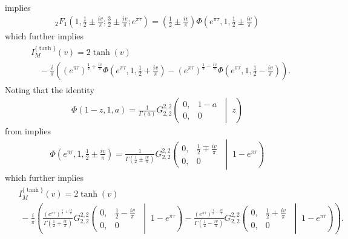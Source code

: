implies
\begin{align}
	{}_{2}F_{1}\left(1, \frac{1}{2} \pm \frac{iv}{\pi}; \frac{3}{2} \pm \frac{iv}{\pi}; e^{\pi \tau}\right)
	 = \left(\frac{1}{2} \pm \frac{iv}{\pi}\right)\Phi\left(e^{\pi\tau}, 1, \frac{1}{2} \pm \frac{iv}{\pi}\right)
\end{align}
which further implies
\begin{align}
\begin{split}
	&I_M^{\{\tanh\}}(v) = 2 \tanh(v) \\
	&\quad - \frac{i}{\pi}\left(
	    \left(e^{\pi\tau}\right)^{\frac{1}{2}+\frac{iv}{\pi}} \Phi \left(e^{\pi\tau}, 1, \frac{1}{2} + \frac{iv}{\pi} \right)
	    - \left(e^{\pi\tau}\right)^{\frac{1}{2}-\frac{iv}{\pi}} \Phi \left(e^{\pi\tau}, 1, \frac{1}{2} - \frac{iv}{\pi} \right)
	\right).
\end{split}
\end{align}
Noting that the identity
\begin{align}
	\Phi\left(1-z, 1, a\right)
	= \frac{1}{\Gamma(a)}
	G_{2,2}^{2,2}
	\left(
	\begin{matrix}
		0, & 1-a \\
		0, & 0
	\end{matrix}\;\middle|\;z
	\right)
\end{align}
from \cite{prudnikov_integrals_2003} implies
\begin{align}
	\Phi\left(e^{\pi\tau}, 1, \frac{1}{2} \pm \frac{iv}{\pi}\right)
	= \frac{1}{\Gamma\left(\frac{1}{2} \pm \frac{iv}{\pi}\right)}
	G_{2,2}^{2,2}
	\left(
	\begin{matrix}
		0, & \frac{1}{2} \mp \frac{iv}{\pi}\\
		0, & 0
	\end{matrix}\;\middle|\; 1 - e^{\pi\tau}
	\right)
\end{align}
which further implies
\begin{align}
	\begin{split}
	&I_M^{\{\tanh\}}(v) = 2 \tanh(v) \\
	&\ - \frac{i}{\pi}\left(
	\frac{\left(e^{\pi\tau}\right)^{\frac{1}{2}+\frac{iv}{\pi}}}{\Gamma\left(\frac{1}{2} + \frac{iv}{\pi}\right)}
	G_{2,2}^{2,2}
	\left(
	\begin{matrix}
		0, & \frac{1}{2} - \frac{iv}{\pi}\\
		0, & 0
	\end{matrix}\;\middle|\; 1 - e^{\pi\tau}
	\right)
	-
	\frac{\left(e^{\pi\tau}\right)^{\frac{1}{2}-\frac{iv}{\pi}}}{\Gamma\left(\frac{1}{2} - \frac{iv}{\pi}\right)}
	G_{2,2}^{2,2}
	\left(
	\begin{matrix}
		0, & \frac{1}{2} + \frac{iv}{\pi}\\
		0, & 0
	\end{matrix}\;\middle|\; 1 - e^{\pi\tau}
	\right)
	\right).
    \end{split}
\end{align}


